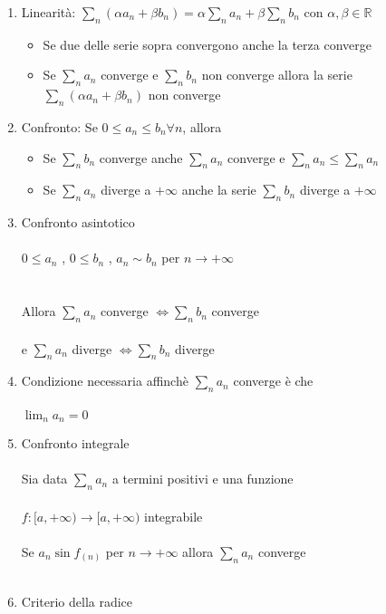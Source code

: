 \documentclass{article}
\begin{document}
\begin{enumerate}
    \item Linearità: \(\sum_n(\alpha a_n+\beta b_n)= \alpha\sum_n a_n + \beta\sum_n b_n\)           con \(\alpha,\beta \in \mathbb{R}\)
    \begin{itemize}
        \item Se due delle serie sopra convergono anche la terza converge
        \item Se \(\sum_n a_n \) converge e \(\sum_n b_n \) non converge allora la serie \(\sum_n(\alpha a_n+\beta b_n)\) non converge
    \end{itemize}
    \item Confronto: Se \(0 \le a_n \le b_n \forall n\), allora
    \begin{itemize}
        \item Se \(\sum_n b_n \) converge anche \(\sum_n a_n \) converge e \(\sum_n a_n \le \sum_n a_n\)
        \item Se \(\sum_n a_n \) diverge a \(+\infty\) anche la serie \(\sum_n b_n \) diverge a \(+\infty\) 
    \end{itemize}
    \item Confronto asintotico\\\\
    \(0\le a_n\) , \(0\le b_n\) , \(a_n \sim b_n\) per \(n\rightarrow +\infty\)\\\\\\
    Allora \(\sum_n a_n\) converge \(\iff \sum_n b_n\) converge\\\\
    e \(\sum_n a_n\) diverge \(\iff \sum_n b_n\) diverge
    \item Condizione necessaria affinchè \(\sum_n a_n\) converge è che\\\\
    \(\lim_n a_n =0\)
    \item Confronto integrale\\\\
    Sia data \(\sum_n a_n \) a termini positivi e una funzione \\\\
    \(f:[a,+\infty)\rightarrow [a,+\infty)\) integrabile\\\\
    Se \(a_n \sin f_{(n)}\) per \(n\rightarrow +\infty\) allora \(\sum_n a_n \) converge\\\\
    \item Criterio della radice\\\\

\end{enumerate}
\end{document}
